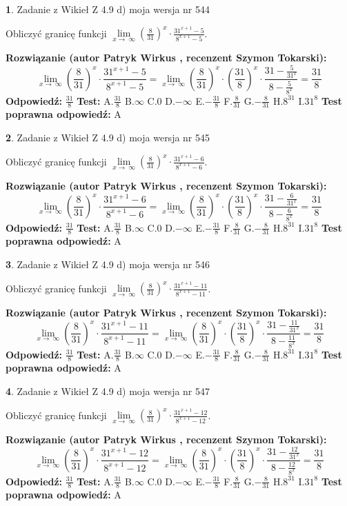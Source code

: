\documentclass[12pt, a4paper]{article}
\theoremstyle{definition} %
\newtheorem{zad}{}
\newcommand{\zadStart}[1]{\begin{zad}#1\newline}
\newcommand{\zadStop}{\end{zad}}
\newcommand{\rozwStart}[2]{\noindent \textbf{Rozwiązanie (autor #1 , recenzent #2): }\newline}
\newcommand{\rozwStop}{\newline}
\newcommand{\odpStart}{\noindent \textbf{Odpowiedź:}\newline}
\newcommand{\odpStop}{\newline}
\newcommand{\testStart}{\noindent \textbf{Test:}\newline}
\newcommand{\testStop}{\newline}
\newcommand{\kluczStart}{\noindent \textbf{Test poprawna odpowiedź:}\newline}
\newcommand{\kluczStop}{\newline}
\begin{document}
\zadStart{Zadanie z Wikieł Z 4.9 d) moja wersja nr 544}


Obliczyć granicę funkcji  $\lim\limits_{x\to\ \infty}(\frac{8}{31})^{x}\cdot\frac{31^{x+1}-5}{8^{x+1}-5}$.
\zadStop
\rozwStart{Patryk Wirkus}{Szymon Tokarski}
$$\lim\limits_{x\to\ \infty}(\frac{8}{31})^{x}\cdot\frac{31^{x+1}-5}{8^{x+1}-5}=\lim\limits_{x\to\ \infty}(\frac{8}{31})^{x}\cdot(\frac{31}{8})^{x} \cdot \frac{31-\frac{5}{31^{x}}}{8-\frac{5}{8^{x}}} = \frac{31}{8}$$
\rozwStop
\odpStart
$\frac{31}{8}$
\odpStop
\testStart
A.$\frac{31}{8}$ B.$\infty$ C.$0$ D.$-\infty$ E.$-\frac{31}{8}$
F.$\frac{8}{31}$ G.$-\frac{8}{31}$
H.$8^{31}$
I.$31^{8}$
\testStop
\kluczStart
A
\kluczStop



\zadStart{Zadanie z Wikieł Z 4.9 d) moja wersja nr 545}


Obliczyć granicę funkcji  $\lim\limits_{x\to\ \infty}(\frac{8}{31})^{x}\cdot\frac{31^{x+1}-6}{8^{x+1}-6}$.
\zadStop
\rozwStart{Patryk Wirkus}{Szymon Tokarski}
$$\lim\limits_{x\to\ \infty}(\frac{8}{31})^{x}\cdot\frac{31^{x+1}-6}{8^{x+1}-6}=\lim\limits_{x\to\ \infty}(\frac{8}{31})^{x}\cdot(\frac{31}{8})^{x} \cdot \frac{31-\frac{6}{31^{x}}}{8-\frac{6}{8^{x}}} = \frac{31}{8}$$
\rozwStop
\odpStart
$\frac{31}{8}$
\odpStop
\testStart
A.$\frac{31}{8}$ B.$\infty$ C.$0$ D.$-\infty$ E.$-\frac{31}{8}$
F.$\frac{8}{31}$ G.$-\frac{8}{31}$
H.$8^{31}$
I.$31^{8}$
\testStop
\kluczStart
A
\kluczStop



\zadStart{Zadanie z Wikieł Z 4.9 d) moja wersja nr 546}


Obliczyć granicę funkcji  $\lim\limits_{x\to\ \infty}(\frac{8}{31})^{x}\cdot\frac{31^{x+1}-11}{8^{x+1}-11}$.
\zadStop
\rozwStart{Patryk Wirkus}{Szymon Tokarski}
$$\lim\limits_{x\to\ \infty}(\frac{8}{31})^{x}\cdot\frac{31^{x+1}-11}{8^{x+1}-11}=\lim\limits_{x\to\ \infty}(\frac{8}{31})^{x}\cdot(\frac{31}{8})^{x} \cdot \frac{31-\frac{11}{31^{x}}}{8-\frac{11}{8^{x}}} = \frac{31}{8}$$
\rozwStop
\odpStart
$\frac{31}{8}$
\odpStop
\testStart
A.$\frac{31}{8}$ B.$\infty$ C.$0$ D.$-\infty$ E.$-\frac{31}{8}$
F.$\frac{8}{31}$ G.$-\frac{8}{31}$
H.$8^{31}$
I.$31^{8}$
\testStop
\kluczStart
A
\kluczStop



\zadStart{Zadanie z Wikieł Z 4.9 d) moja wersja nr 547}


Obliczyć granicę funkcji  $\lim\limits_{x\to\ \infty}(\frac{8}{31})^{x}\cdot\frac{31^{x+1}-12}{8^{x+1}-12}$.
\zadStop
\rozwStart{Patryk Wirkus}{Szymon Tokarski}
$$\lim\limits_{x\to\ \infty}(\frac{8}{31})^{x}\cdot\frac{31^{x+1}-12}{8^{x+1}-12}=\lim\limits_{x\to\ \infty}(\frac{8}{31})^{x}\cdot(\frac{31}{8})^{x} \cdot \frac{31-\frac{12}{31^{x}}}{8-\frac{12}{8^{x}}} = \frac{31}{8}$$
\rozwStop
\odpStart
$\frac{31}{8}$
\odpStop
\testStart
A.$\frac{31}{8}$ B.$\infty$ C.$0$ D.$-\infty$ E.$-\frac{31}{8}$
F.$\frac{8}{31}$ G.$-\frac{8}{31}$
H.$8^{31}$
I.$31^{8}$
\testStop
\kluczStart
A
\kluczStop
\end{document}
